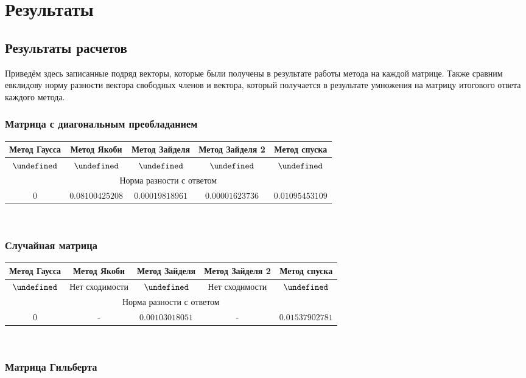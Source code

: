 \documentclass[../../report.tex]{subfiles}
\let\dominatedGauss\dominatedResult
\let\dominatedResult\undefined
\let\randomGauss\randomResult
\let\randomResult\undefined
\let\dominatedJacobi\dominatedResult
\let\dominatedResult\undefined
\let\randomResult\undefined
\let\dominatedSeidel\dominatedResult
\let\dominatedResult\undefined
\let\randomSeidel\randomResult
\let\randomResult\undefined
\let\dominatedSeidelRel\dominatedResult
\let\dominatedResult\undefined
\let\randomResult\undefined
\let\dominatedGrad\dominatedResult
\let\dominatedResult\undefined
\let\randomGrad\randomResult
\let\randomResult\undefined
\begin{document}
\chapter{Результаты}

\section{Результаты расчетов}
    Приведём здесь записанные подряд векторы, которые были получены в результате работы метода на каждой матрице. 
    Также сравним евклидову норму разности вектора свободных членов и вектора, который получается в результате умножения на матрицу итогового ответа каждого метода.

\subsection{Матрица с диагональным преобладанием}
\begin{tabular}{|c|c|c|c|c|}
\hline
Метод Гаусса & Метод Якоби & Метод Зайделя & Метод Зайделя 2 & Метод спуска\\
\hline
$ \dominatedGauss $  
  &
$ \dominatedJacobi $
  &
$ \dominatedSeidel $
  &
$ \dominatedSeidelRel $
  &
$ \dominatedGrad $ \\
\hline
\multicolumn{5}{|c|}{Норма разности с ответом}\\
\hline
$0$ & $0.08100425208$ & $0.00019818961$ & $0.00001623736$ & $0.01095453109$ \\ 
\hline
\end{tabular} \\

\subsection{Случайная матрица}

\begin{tabular}{|c|c|c|c|c|}
\hline
Метод Гаусса & Метод Якоби & Метод Зайделя & Метод Зайделя 2 & Метод спуска\\
\hline
$ \randomGauss $  
  &
Нет сходимости 
  &
$ \randomSeidel $
  &
Нет сходимости
  &
$ \randomGrad $ \\
\hline
\multicolumn{5}{|c|}{Норма разности с ответом}\\
\hline
$0$ & - & $0.00103018051$ & - & $0.01537902781$ \\
\hline
\end{tabular} \\

\subsection{Матрица Гильберта}
\end{document}
